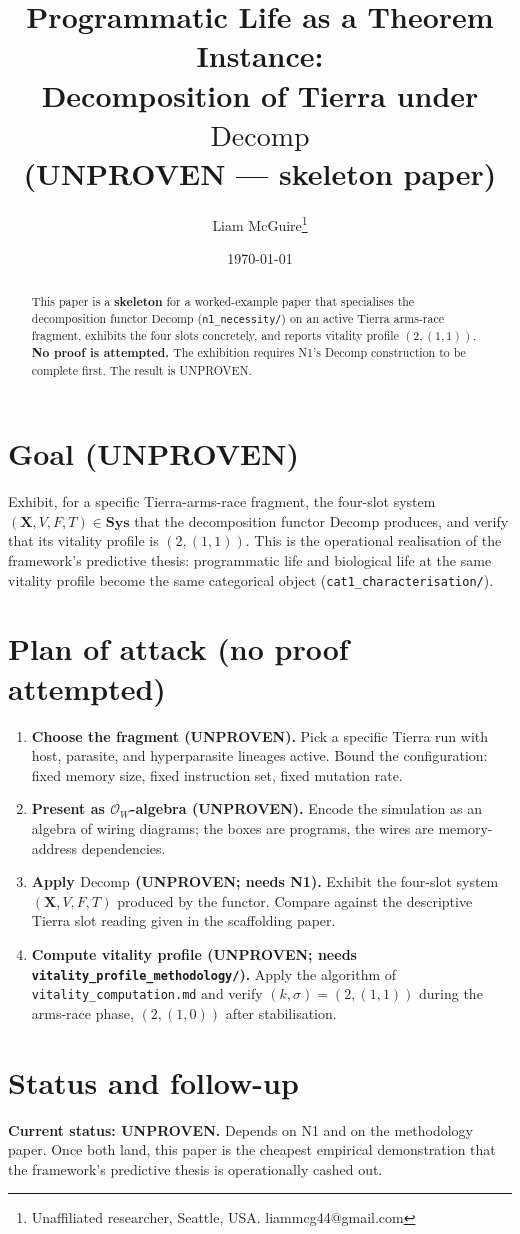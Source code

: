 \documentclass[11pt]{article}
\title{Programmatic Life as a Theorem Instance: \\
       Decomposition of Tierra under $\mathrm{Decomp}$ \\
       \large (UNPROVEN --- skeleton paper)}
\author{Liam McGuire\thanks{Unaffiliated researcher, Seattle, USA. liammcg44@gmail.com}}
\date{\today}
\theoremstyle{plain}
\theoremstyle{definition}
\newcommand{\X}{\mathbf{X}}
\begin{document}
\maketitle

\begin{abstract}
This paper is a \textbf{skeleton} for a worked-example paper that
specialises the decomposition functor $\mathrm{Decomp}$
(\texttt{n1\_necessity/}) on an active Tierra arms-race fragment,
exhibits the four slots concretely, and reports vitality profile
$(2, (1, 1))$. \textbf{No proof is attempted.} The exhibition
requires N1's Decomp construction to be complete first. The result is
UNPROVEN.
\end{abstract}

\section{Goal (UNPROVEN)}

Exhibit, for a specific Tierra-arms-race fragment, the four-slot
system $(\X, V, F, T) \in \mathbf{Sys}$ that the decomposition
functor $\mathrm{Decomp}$ produces, and verify that its vitality
profile is $(2, (1, 1))$. This is the operational realisation of the
framework's predictive thesis: programmatic life and biological life
at the same vitality profile become the same categorical object
(\texttt{cat1\_characterisation/}).

\section{Plan of attack (no proof attempted)}

\begin{enumerate}[leftmargin=2em,itemsep=4pt]
  \item \textbf{Choose the fragment (UNPROVEN).} Pick a specific
    Tierra run with host, parasite, and hyperparasite lineages
    active. Bound the configuration: fixed memory size, fixed
    instruction set, fixed mutation rate.
  \item \textbf{Present as $\mathcal{O}_W$-algebra (UNPROVEN).}
    Encode the simulation as an algebra of wiring diagrams; the
    boxes are programs, the wires are memory-address dependencies.
  \item \textbf{Apply $\mathrm{Decomp}$ (UNPROVEN; needs N1).}
    Exhibit the four-slot system $(\X, V, F, T)$ produced by the
    functor. Compare against the descriptive Tierra slot reading
    given in the scaffolding paper.
  \item \textbf{Compute vitality profile (UNPROVEN; needs
    \texttt{vitality\_profile\_methodology/}).} Apply the algorithm
    of \texttt{vitality\_computation.md} and verify $(k, \sigma) =
    (2, (1, 1))$ during the arms-race phase, $(2, (1, 0))$ after
    stabilisation.
\end{enumerate}

\section{Status and follow-up}

\textbf{Current status: UNPROVEN.} Depends on N1 and on the
methodology paper. Once both land, this paper is the cheapest
empirical demonstration that the framework's predictive thesis is
operationally cashed out.



\end{document}
